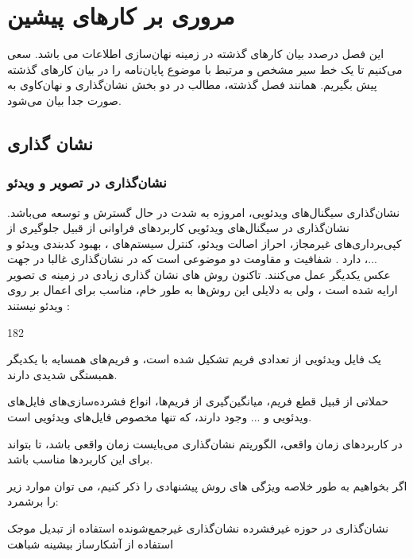 \chapter{مروری بر کارهای پیشین}

\begin{intro}
این فصل درصدد بیان کارهای گذشته در زمینه نهان‌سازی اطلاعات می باشد. سعی می‌کنیم تا یک خط سیر مشخص و مرتبط با موضوع پایان‌نامه را در بیان کارهای گذشته پیش بگیریم. همانند فصل گذشته، مطالب در دو بخش نشان‌گذاری و نهان‌کاوی به صورت جدا بیان می‌شود. 
\end{intro}


\section{نشان گذاری}
\subsection{نشان‌گذاری در تصویر و ویدئو}
نشان‌گذاری سیگنال‌های ویدئویی، امروزه به شدت در حال گسترش و توسعه می‌باشد. نشان‌گذاری در سیگنال‌های ویدئویی کاربردهای فراوانی از قبیل جلوگیری از کپی‌برداری‌های غیرمجاز، احراز اصالت ویدئو، کنترل سیستم‌های  {}، بهبود کدبندی ویدئو و ...، دارد  {\cite{Doerr2003}}.
شفافیت و مقاومت دو موضوعی است که در نشان‌گذاری غالبا در جهت عکس یکدیگر عمل می‌کنند. تاکنون روش های نشان گذاری زیادی در زمینه ی تصویر ارایه شده است {\cite{Jagadeesh2010,Bandyopadhyay2009,Buse2009,Wang2009a}}، ولی به دلایلی این روش‌ها به طور خام، مناسب برای اعمال بر روی ویدئو نیستند {\cite{Chen2010c}}:
\begin{dingautolist}{182}
\item
یک فایل ویدئویی از  تعدادی فریم تشکیل شده است، و فریم‌های همسایه با یکدیگر همبستگی شدیدی دارند. 
\item
حملاتی از قبیل قطع فریم، میانگین‌گیری از فریم‌ها، انواع فشرده‌سازی‌های فایل‌های ویدئویی و ... وجود دارند، که تنها مخصوص فایل‌های ویدئویی است.
\item{}
در کاربردهای زمان واقعی، الگوریتم نشان‌گذاری می‌بایست زمان واقعی باشد، تا بتواند برای این کاربردها مناسب باشد. 
\end{dingautolist}
اگر بخواهیم به طور خلاصه ویژگی های روش  پیشنهادی را ذکر کنیم، می توان موارد زیر را برشمرد:
\begin{itemize}
\incl
نشان‌گذاری در حوزه غیرفشرده
\incl
نشان‌گذاری غیرجمع‌شونده
\incl
استفاده از تبدیل موجک
\incl
استفاده از آشکارساز بیشینه شباهت
\end{itemize}

